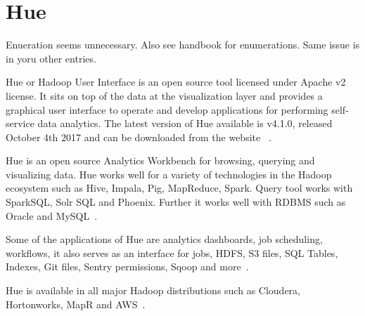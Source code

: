 \section{Hue}

\begin{NOTE}
Enueration seems unnecessary. Also see handbook for enumerations. Same
issue is in yoru other entries.
\end{NOTE}

Hue or Hadoop User Interface is an open source tool licensed 
under Apache v2 license. It sits on top of the data at the 
visualization layer and provides a graphical user interface to 
operate and develop applications for performing self-service 
data analytics.
The latest version of Hue available is v4.1.0, released October 
4th 2017 and can be downloaded from the website
~\cite{hid-sp18-517-hue-apache}.

Hue is an open source Analytics Workbench for browsing, querying 
and visualizing data.
Hue works well for a variety of technologies in the Hadoop 
ecosystem such as Hive, Impala, Pig, MapReduce, Spark. Query 
tool works with SparkSQL, Solr SQL and Phoenix. Further it works 
well with RDBMS such as Oracle and MySQL~\cite{hid-sp18-517-Hue-wiki}. 

Some of the applications of Hue are analytics dashboards, job scheduling, 
workflows, it also serves as an interface for jobs, HDFS, S3 files, 
SQL Tables, Indexes, Git files, Sentry permissions, Sqoop and more~\cite{hid-sp18-517-Hue-wiki}.

Hue is available in all major Hadoop distributions such as Cloudera, 
Hortonworks, MapR and AWS~\cite{hid-sp18-517-Hue-wiki}.

